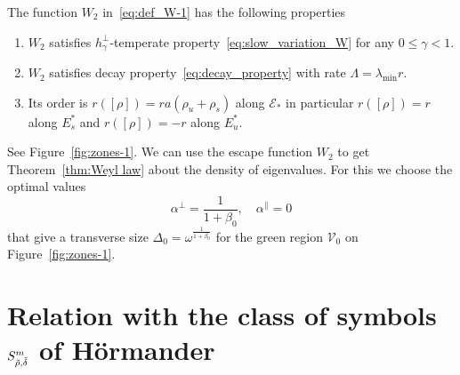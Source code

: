 \documentclass[AHL,Unicode,longabstracts,published]{cedram}
\newcommand{\clV}{\mathcal{V}}
\newcommand{\clE}{\mathcal{E}}
\let\oldtilde\tilde
\renewcommand*{\tilde}[1]{\mathchoice{\widetilde{#1}}{\widetilde{#1}}{\oldtilde{#1}}{\oldtilde{#1}}}
\begin{document}
\begin{cBoxB}{}
\begin{lemm}
The function $W_{2}$ in~\eqref{eq:def_W-1} has the following properties
\begin{enumerate}
\item \label{enu:-satisfies--temperate}
$W_{2}$ satisfies $h_{\gamma}^{\perp}$-temperate property~\eqref{eq:slow_variation_W} for any $0\leq\gamma<1$.
\item \label{enu:-satisfies-decay}
$W_{2}$ satisfies decay property~\eqref{eq:decay_property} with rate $\Lambda=\lambda_{\min}r$.
\item \label{enu:Its-order-is}
Its order is $r([\rho])=ra(\rho_{u}+\rho_{s})$ along $\clE_{*}$ in particular $r([\rho])=r$ along $E_{s}^{*}$ and $r([\rho])=-r$ along $E_{u}^{*}$.
\end{enumerate}
\end{lemm}
\end{cBoxB}

See Figure~\ref{fig:zones-1}. We can use the escape function $W_{2}$ to get Theorem~\ref{thm:Weyl law} about the density of eigenvalues. For this we choose the optimal values
\[
\alpha^{\perp}=\frac{1}{1+\beta_{0}},\quad\alpha^{\parallel}=0
\]
that give a transverse size $\Delta_{0}=\omega^{\frac{1}{1+\beta_{0}}}$ for the green region $\clV_{0}$ on Figure~\ref{fig:zones-1}.



\section{\label{sec:Hormander}
Relation with the class of symbols \texorpdfstring{$S_{\tilde{\rho},\tilde{\delta}}^{m}$}{S rho, deltam} of H\"ormander}
\end{document}
